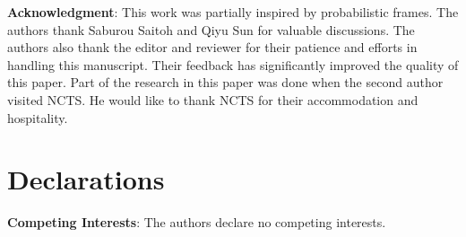 \documentclass{amsart}
\numberwithin{equation}{section}
\theoremstyle{plain}
\theoremstyle{remark}
\theoremstyle{definition}
\begin{document}
 \vspace{0.3cm}

{\bf Acknowledgment}: This work was partially inspired by probabilistic frames. The authors thank Saburou Saitoh and Qiyu Sun for valuable discussions. The authors also thank the editor and reviewer for their patience and efforts in handling this manuscript. Their feedback has significantly improved the quality of this paper.  
Part of the research in this paper was done when the second author visited NCTS. He would like to thank NCTS for their accommodation and hospitality.


\section*{Declarations}
{\bf Competing Interests}: The authors declare no competing interests.

 

\end{document}

